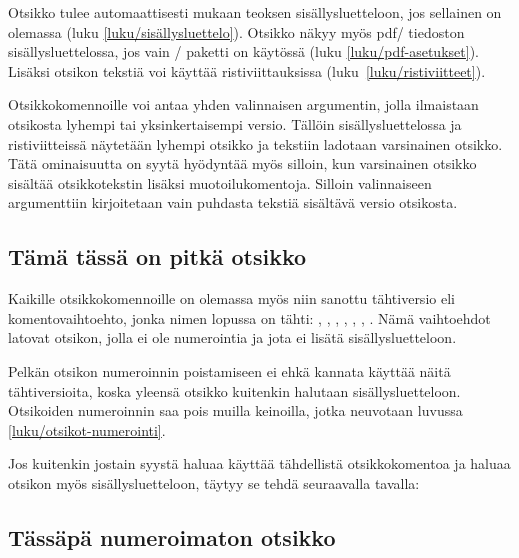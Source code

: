 Otsikko tulee automaattisesti mukaan teoksen sisällysluetteloon, jos
sellainen on olemassa (luku \ref{luku/sisällysluettelo}). Otsikko näkyy
myös pdf\-/ tiedoston sisällysluettelossa, jos vain
\-/ paketti on käytössä (luku
\ref{luku/pdf-asetukset}). Lisäksi otsikon tekstiä voi käyttää
ristiviittauksissa (luku~\ref{luku/ristiviitteet}).

Otsikkokomennoille voi antaa yhden valinnaisen argumentin, jolla
ilmaistaan otsikosta lyhempi tai yksinkertaisempi versio. Tällöin
sisällysluettelossa ja ristiviitteissä näytetään lyhempi otsikko ja
tekstiin ladotaan varsinainen otsikko. Tätä ominaisuutta on syytä
hyödyntää myös silloin, kun varsinainen otsikko sisältää otsikkotekstin
lisäksi muotoilukomentoja. Silloin valinnaiseen argumenttiin
kirjoitetaan vain puhdasta tekstiä sisältävä versio otsikosta.

\begin{koodilohkosis}
\section[Lyhyt otsikko]{Tämä tässä on pitkä otsikko}
\end{koodilohkosis}

Kaikille otsikkokomennoille on olemassa myös niin sanottu tähtiversio
eli komentovaihtoehto, jonka nimen lopussa on tähti: ,
, , ,
, , .
Nämä vaihtoehdot latovat otsikon, jolla ei ole numerointia ja jota ei
lisätä sisällysluetteloon.

Pelkän otsikon numeroinnin poistamiseen ei ehkä kannata käyttää näitä
tähtiversioita, koska yleensä otsikko kuitenkin halutaan
sisällysluetteloon. Otsikoiden numeroinnin saa pois muilla keinoilla,
jotka neuvotaan luvussa \ref{luku/otsikot-numerointi}.

Jos kuitenkin jostain syystä haluaa käyttää tähdellistä otsikkokomentoa
ja haluaa otsikon myös sisällysluetteloon, täytyy se tehdä seuraavalla
tavalla:

\begin{koodilohkosis}
\section*{Tässäpä numeroimaton otsikko}
{}
\end{koodilohkosis}

